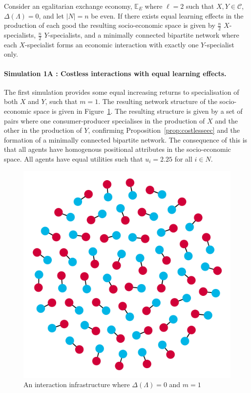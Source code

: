 \begin{proposition} \label{prop:costlesseec}
Consider an egalitarian exchange economy, $\mathbb{E}_{E}$ where $\ell = 2$ such that $X,Y \in \mathcal{C}$,  $\Delta(\Lambda) = 0$, and let $|N|=n$ be even. If there exists equal learning effects in the production of each good the resulting socio-economic space is given by $\frac{n}{2}$ $X$-specialists, $\frac{n}{2}$ $Y$-specialists, and a minimally connected bipartite network where each $X$-specialist forms an economic interaction with exactly one $Y$-specialist only.
\end{proposition}

\paragraph{Simulation 1A : Costless interactions with equal learning effects.}

The first simulation provides some equal increasing returns to specialisation of both $X$ and $Y$, such that $m = 1$. The resulting network structure of the socio-economic space is given in Figure~\ref{Sim1}. The resulting structure is given by a set of pairs where one consumer-producer specialises in the production of $X$ and the other in the production of $Y$, confirming Proposition~\ref{prop:costlesseec} and the formation of a minimally connected bipartite network. The consequence of this is that all agents have homogenous positional attributes in the socio-economic space. All agents have equal utilities such that $u_{i} = 2.25$ for all $i \in N$.

\begin{figure}[t]
\centering
\includegraphics[scale=0.22]{Images/Sim1E.png}
\caption{An interaction infrastructure where $\Delta(\Lambda)=0$ and $m=1$}
\label{Sim1}
\end{figure}


